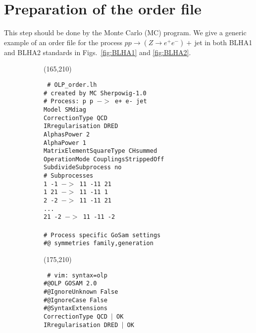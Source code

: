 \section{Preparation of the order file}
This step should be done by the Monte Carlo (MC) program. 
We give a generic example of an order file for the process 
$pp\to (Z\to e^+e^-)+$\,jet in both BLHA1 and BLHA2 standards 
in Figs.~\ref{fig:BLHA1} and \ref{fig:BLHA2}.
\begin{figure}[htb!]
\begin{subfigure}[]{0.49\textwidth}
\framebox(165,210){%
    \parbox[t]{165\unitlength}{\tt\scriptsize
\# OLP\_order.lh   \\
\# created by MC Sherpowig-1.0\\
\# Process: p p $->$ e+ e- jet\\
Model                    SMdiag\\
CorrectionType           QCD\\
IRregularisation         DRED\\
AlphasPower              2\\
AlphaPower               1\\
MatrixElementSquareType  CHsummed\\
OperationMode            CouplingsStrippedOff\\
SubdivideSubprocess      no\\
\# Subprocesses \\
1 -1 $->$ 11 -11 21\\ 
1 21 $->$ 11 -11 1\\
2 -2 $->$ 11 -11 21\\
...\\
21 -2 $->$ 11 -11 -2\\
\\
\# Process specific GoSam settings\\
\#@ symmetries family,generation}
}
\end{subfigure}
\begin{subfigure}[]{0.49\textwidth}
\framebox(175,210){%
    \parbox[t]{175\unitlength}{\tt\scriptsize
\# vim: syntax=olp\\
\#@OLP GOSAM 2.0\\
\#@IgnoreUnknown False\\
\#@IgnoreCase False\\
\#@SyntaxExtensions \\
CorrectionType QCD $|$ OK\\
IRregularisation DRED $|$ OK\\
}}
\end{subfigure}
\end{figure}
